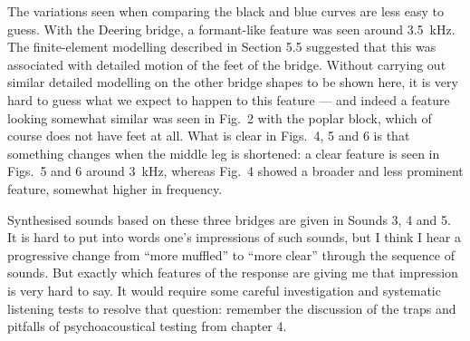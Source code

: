 


  The variations seen when comparing the black and blue curves are less easy to 
  guess. With the Deering bridge, a formant-like feature was seen around 
  3.5~kHz. The finite-element modelling described in Section 5.5 suggested that 
  this was associated with detailed motion of the feet of the bridge. Without 
  carrying out similar detailed modelling on the other bridge shapes to be 
  shown here, it is very hard to guess what we expect to happen to this feature 
  --- and indeed a feature looking somewhat similar was seen in Fig.\ 2 with 
  the poplar block, which of course does not have feet at all. What is clear in 
  Figs.\ 4, 5 and 6 is that something changes when the middle leg is shortened: 
  a clear feature is seen in Figs.\ 5 and 6 around 3~kHz, whereas Fig.\ 4 
  showed a broader and less prominent feature, somewhat higher in frequency. 

  Synthesised sounds based on these three bridges are given in Sounds 3, 4 and 
  5. It is hard to put into words one's impressions of such sounds, but I think 
  I hear a progressive change from ``more muffled'' to ``more clear'' through 
  the sequence of sounds. But exactly which features of the response are giving 
  me that impression is very hard to say. It would require some careful 
  investigation and systematic listening tests to resolve that question: 
  remember the discussion of the traps and pitfalls of psychoacoustical testing 
  from chapter 4. 




